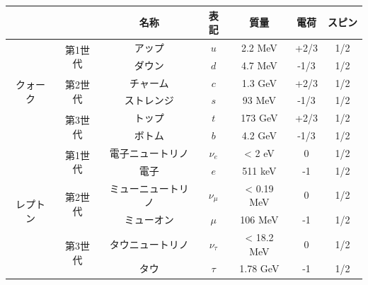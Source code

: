 \begin{table}[]
    \begin{tabular}{ccccccc}
    \hline
                                               &                                            & 名称        & 表記           & 質量                 & 電荷   & スピン \\ 
    \hline\hline
    \multicolumn{1}{c|}{\multirow{6}{*}{クォーク}} & \multicolumn{1}{c|}{\multirow{2}{*}{第1世代}} & アップ       & $u$            & 2.2 MeV            & +2/3 & 1/2 \\
    \multicolumn{1}{c|}{}                      & \multicolumn{1}{c|}{}                      & ダウン       & $d$            & 4.7 MeV            & -1/3 & 1/2 \\ \cline{2-7}
    \multicolumn{1}{c|}{}                      & \multicolumn{1}{c|}{\multirow{2}{*}{第2世代}} & チャーム      & $c$            & 1.3 GeV            & +2/3 & 1/2 \\
    \multicolumn{1}{c|}{}                      & \multicolumn{1}{c|}{}                      & ストレンジ     & $s$            & 93 MeV             & -1/3 & 1/2 \\ \cline{2-7}
    \multicolumn{1}{c|}{}                      & \multicolumn{1}{c|}{\multirow{2}{*}{第3世代}} & トップ       & $t$            & 173 GeV            & +2/3 & 1/2 \\
    \multicolumn{1}{c|}{}                      & \multicolumn{1}{c|}{}                      & ボトム       & $b$            & 4.2 GeV            & -1/3 & 1/2 \\ \cline{2-2}
    \hline\hline
    \multicolumn{1}{c|}{\multirow{6}{*}{レプトン}} & \multicolumn{1}{c|}{\multirow{2}{*}{第1世代}} & 電子ニュートリノ  & $\nu_{e}$    & < 2 eV     & 0    & 1/2 \\
    \multicolumn{1}{c|}{}                      & \multicolumn{1}{c|}{}                      & 電子        & $e$            & 511 keV            & -1   & 1/2 \\ \cline{2-7}
    \multicolumn{1}{c|}{}                      & \multicolumn{1}{c|}{\multirow{2}{*}{第2世代}} & ミューニュートリノ & $\nu_{\mu}$  & < 0.19 MeV & 0    & 1/2 \\
    \multicolumn{1}{c|}{}                      & \multicolumn{1}{c|}{}                      & ミューオン     & $\mu$        & 106 MeV            & -1   & 1/2 \\ \cline{2-7}
    \multicolumn{1}{c|}{}                      & \multicolumn{1}{c|}{\multirow{2}{*}{第3世代}} & タウニュートリノ  & $\nu_{\tau}$ & < 18.2 MeV & 0    & 1/2 \\
    \multicolumn{1}{c|}{}                      & \multicolumn{1}{c|}{}                      & タウ        & $\tau$       & 1.78 GeV           & -1   & 1/2 \\ \hline
    \end{tabular}
\end{table}

